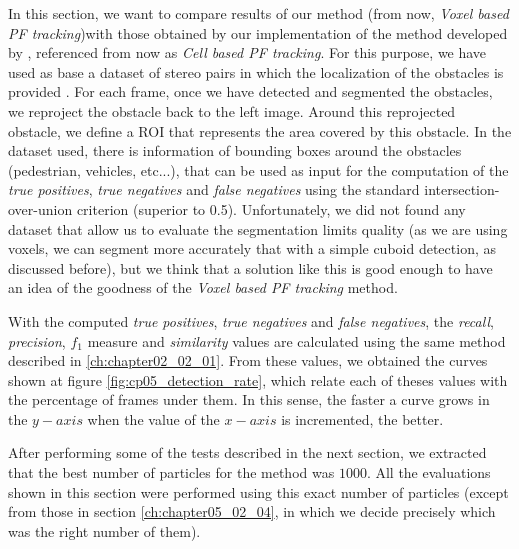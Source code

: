 In this section, we want to compare results of our method (from now, \emph{Voxel based PF tracking})with those obtained by our implementation of the method developed by \cite{danescu2012particle}, referenced from now as \emph{Cell based PF tracking}. For this purpose, we have used as base a dataset of stereo pairs in which the localization of the obstacles is provided \citep{geiger2013vision}. For each frame, once we have detected and segmented the obstacles, we reproject the obstacle back to the left image. Around this reprojected obstacle, we define a \ac{ROI} that represents the area covered by this obstacle. In the dataset used, there is information of bounding boxes around the obstacles (pedestrian, vehicles, etc...), that can be used as input for the computation of the \emph{true positives}, \emph{true negatives} and \emph{false negatives} using the standard intersection-over-union criterion (superior to 0.5). Unfortunately, we did not found any dataset that allow us to evaluate the segmentation limits quality (as we are using voxels, we can segment more accurately that with a simple cuboid detection, as discussed before), but we think that a solution like this is good enough to have an idea of the goodness of the \emph{Voxel based PF tracking} method.

With the computed \emph{true positives}, \emph{true negatives} and \emph{false negatives}, the \emph{recall}, \emph{precision}, \emph{$f_1$} measure and \emph{similarity} values are calculated using the same method described in \ref{ch:chapter02_02_01}. From these values, we obtained the curves shown at figure \ref{fig:cp05_detection_rate}, which relate each of theses values with the percentage of frames under them. In this sense, the faster a curve grows in the $y-axis$ when the value of the $x-axis$ is incremented, the better.

After performing some of the tests described in the next section, we extracted that the best number of particles for the method was $1000$. All the evaluations shown in this section were performed using this exact number of particles (except from those in section \ref{ch:chapter05_02_04}, in which we decide precisely which was the right number of them).

